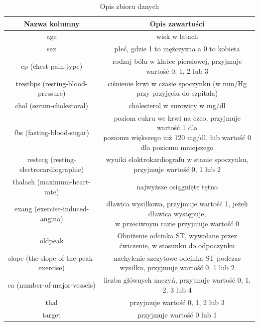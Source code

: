 \documentclass{classrep}
\begin{document}
{        \begin{table}
            \centering
            \begin{tabular}{|c|c|}
                \hline
                Nazwa kolumny & Opis zawartości \\ \hline
                age & wiek w latach   \\ \hline
                sex & płeć, gdzie 1 to mężczyzna a 0 to kobieta  \\ \hline
                cp (chest-pain-type) & rodzaj bólu w klatce piersiowej, przyjmuje wartość 0, 1, 2 lub 3  \\ \hline
                trestbps (resting-blood-pressure) & ciśnienie krwi w czasie spoczynku (w mm/Hg przy przyjęciu do szpitala) \\ \hline
                chol (serum-cholestoral) & cholesterol w surowicy w mg/dl  \\ \hline
                fbs (fasting-blood-sugar) & \makecell{poziom cukru we krwi na czco, przyjmuje wartość 1 dla \\ poziomu większego niż 120 mg/dl, lub wartość 0 dla poziomu mniejszego}  \\ \hline
                restecg (resting-electrocardiographic) & wyniki eloktrokardiografu w stanie spoczynku, przyjmuje wartość 0, 1 lub 2   \\ \hline
                thalach (maximum-heart-rate) & najwyższe osiągnięte tętno   \\ \hline
                exang (exercise-induced-angina) & \makecell{dławica wysiłkowa, przyjmuje wartość 1, jeżeli dławica występuje, \\ w przeciwnym razie przyjmuje wartość 0}   \\ \hline
                oldpeak & Obniżenie odcinka ST, wywołane przez ćwiczenie, w stosunku do odpoczynku   \\ \hline
                slope (the-slope-of-the-peak-exercise) & nachylenie szczytowe odcinka ST podczas wysiłku, przyjmuje wartość 0, 1 lub 2  \\ \hline
                ca (number-of-major-vessels) & liczba głównych naczyń, przyjmuje wartość 0, 1, 2, 3 lub 4  \\ \hline
                thal & przyjmuje wartość 0, 1, 2 lub 3   \\ \hline
                target & przyjmuje wartość 0 lub 1 \\ \hline
            \end{tabular}
            \caption{Opis zbioru danych}

\end{table}}
\end{document}
